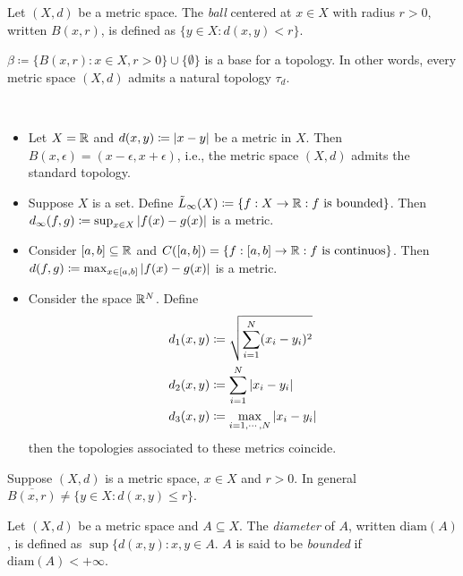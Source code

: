 \documentclass{techreport}
\begin{document}
\begin{definition}\label{De:OpenBalls}
	Let $(X,d)$ be a metric space.
	The \emph{ball} centered at $x \in X$ with radius $r > 0$, written $B(x,r)$, is defined as $\{ y \in X : d(x,y) < r\}$.
\end{definition}

\begin{lemma}\label{Lem:MetricInduceTop}
	$\beta \coloneqq \{ B(x,r) : x \in X, r > 0 \} \cup \{ \emptyset \}$ is a base for a topology.
	In other words, every metric space $(X,d)$ admits a natural topology $\tau_d$.
\end{lemma}

\begin{example}\label{Exa:MetricSpaces}\
	\begin{itemize}
		\item Let $X = \mathbb{R}$ and $d(x,y) \coloneqq \left|{x-y}\right|$ be a metric in $X$.
		Then $B(x,\epsilon) = (x-\epsilon,x+\epsilon)$, i.e., the metric space $(X,d)$ admits the standard topology.
		\item Suppose $X$ is a set.
		Define $\tilde{L}_\infty(X) \coloneqq \{ f :  X \to \mathbb{R} : f~\text{is bounded} \}$.
		Then $d_\infty(f,g) \coloneqq \sup_{x \in X} \left|{f(x) - g(x)}\right|$ is a metric.
		\item Consider $[a,b] \subseteq \mathbb{R}$ and $C([a,b]) = \{ f : [a,b] \to \mathbb{R} : f~\text{is continuos}\}$.
		Then $d(f,g) \coloneqq \max_{x \in [a,b]} \left|{f(x)-g(x)}\right|$ is a metric.
		\item Consider the space $\mathbb{R}^N$.
		Define
		\begin{align*}
			d_1(x,y) & \coloneqq \sqrt{\sum_{i=1}^N (x_i-y_i)^2} \\
			d_2(x,y) & \coloneqq \sum_{i=1}^N \left|{x_i - y_i}\right| \\
			d_3(x,y) & \coloneqq \max_{i=1,\cdots,N} \left|{x_i - y_i}\right|
		\end{align*}
		then the topologies associated to these metrics coincide.
	\end{itemize}
\end{example}

\begin{remark}\label{Rem:ClosureOfBallsNotClosedBalls}
	Suppose $(X,d)$ is a metric space, $x \in X$ and $r > 0$.
	In general $\overline{B(x,r)} \neq \{y \in X : d(x,y) \le r \}$.
\end{remark}

\begin{definition}\label{De:Diameter}
	Let $(X,d)$ be a metric space and $A \subseteq X$.
	The \emph{diameter} of $A$, written $\mathrm{diam}(A)$, is defined as $\sup \{ d(x,y) : x,y \in A$.
	$A$ is said to be \emph{bounded} if $\mathrm{diam}(A) < +\infty$.
\end{definition}
\end{document}
